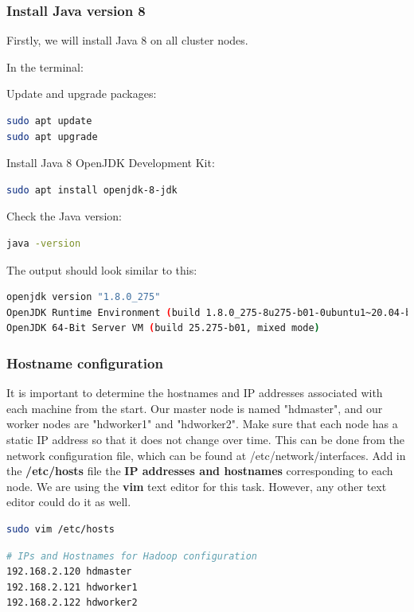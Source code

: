 \documentclass[12pt,english]{book}
\begin{document}
\subsubsection{Install Java version 8}

Firstly, we will install Java 8 on all cluster nodes.

In the terminal:

{\parindent 0pt Update and upgrade packages:}
\begin{lstlisting}[language=bash, frame=single]
sudo apt update
sudo apt upgrade
\end{lstlisting}
Install Java 8 OpenJDK Development Kit:
\begin{lstlisting}[language=bash, frame=single]
sudo apt install openjdk-8-jdk
\end{lstlisting}
Check the Java version:
\begin{lstlisting}[language=bash, frame=single]
java -version
\end{lstlisting}
The output should look similar to this: 
\begin{lstlisting}[language=bash, frame=single]
openjdk version "1.8.0_275"
OpenJDK Runtime Environment (build 1.8.0_275-8u275-b01-0ubuntu1~20.04-b01)
OpenJDK 64-Bit Server VM (build 25.275-b01, mixed mode)
\end{lstlisting}


\subsubsection{Hostname configuration}


It is important to determine the hostnames and IP addresses associated with each machine from the start.
Our master node is named "hdmaster", and our worker nodes are "hdworker1" and "hdworker2".
Make sure that each node has a static IP address so that it does not change over time.
This can be done from the network configuration file, which can be found at /etc/network/interfaces.
Add in the \textbf{/etc/hosts} file the \textbf{IP addresses and hostnames} corresponding to each node.
We are using the \textbf{vim} text editor for this task.
However, any other text editor could do it as well.
\begin{lstlisting}[language=bash, frame=single]
sudo vim /etc/hosts
\end{lstlisting}
\begin{lstlisting}[language=bash, frame=single]
# IPs and Hostnames for Hadoop configuration
192.168.2.120 hdmaster
192.168.2.121 hdworker1
192.168.2.122 hdworker2
\end{lstlisting}
\end{document}

